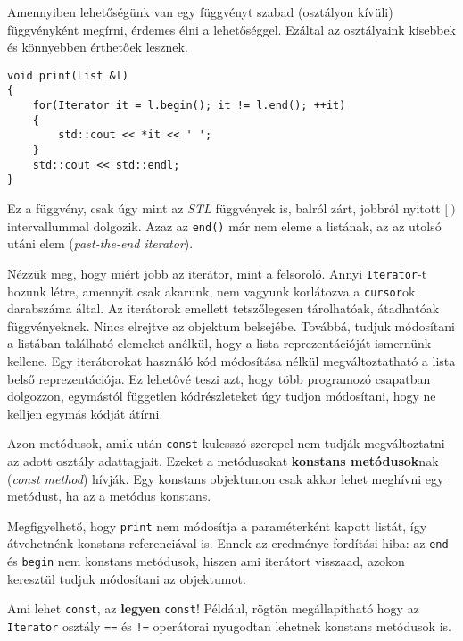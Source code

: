 \documentclass[a4paper,11.5pt,table]{article}
\begin{document}
 	Amennyiben lehetőségünk van egy függvényt szabad (osztályon kívüli) függvényként megírni, érdemes élni a lehetőséggel. Ezáltal az osztályaink kisebbek és könnyebben érthetőek lesznek.
	\begin{lstlisting}
void print(List &l)
{
	for(Iterator it = l.begin(); it != l.end(); ++it)
	{
		std::cout << *it << ' ';
	}
	std::cout << std::endl;
}
	\end{lstlisting}
	Ez a függvény, csak úgy mint az \textit{STL} függvények is, balról zárt, jobbról nyitott $[\ )$ intervallummal dolgozik. Azaz az \texttt{end()} már nem eleme a listának, az az utolsó {utáni} elem (\textit{past-the-end iterator}).
	
	\medskip
	Nézzük meg, hogy miért jobb az iterátor, mint a felsoroló. Annyi \texttt{Iterator}-t hozunk létre, amennyit csak akarunk, nem vagyunk korlátozva a \texttt{cursor}ok darabszáma által. Az iterátorok emellett tetszőlegesen tárolhatóak, átadhatóak függvényeknek. Nincs elrejtve az objektum belsejébe. Továbbá, tudjuk módosítani a listában található elemeket anélkül, hogy a lista reprezentációját ismernünk kellene. Egy iterátorokat használó kód módosítása nélkül megváltoztatható a lista belső reprezentációja. Ez lehetővé teszi azt, hogy több programozó csapatban dolgozzon, egymástól független kódrészleteket úgy tudjon módosítani, hogy ne kelljen egymás kódját átírni.
	
	\medskip
	Azon metódusok, amik után \texttt{const} kulcsszó szerepel nem tudják megváltoztatni az adott osztály adattagjait. Ezeket a metódusokat \textbf{konstans metódusok}nak (\textit{const method}) hívják. Egy konstans objektumon csak akkor lehet meghívni egy metódust, ha az a metódus konstans.
	
	\medskip
	Megfigyelhető, hogy \texttt{print} nem módosítja a paraméterként kapott listát, így átvehetnénk konstans referenciával is. Ennek az eredménye fordítási hiba: az \texttt{end} és \texttt{begin} nem konstans metódusok, hiszen ami iterátort visszaad, azokon keresztül tudjuk módosítani az objektumot.
	\begin{note}
		Ami lehet \texttt{const}, az \textbf{legyen} \texttt{const}! Például, rögtön megállapítható hogy az \texttt{Iterator} osztály \texttt{==} és \texttt{!=} operátorai nyugodtan lehetnek konstans metódusok is.
	\end{note}
\end{document}

